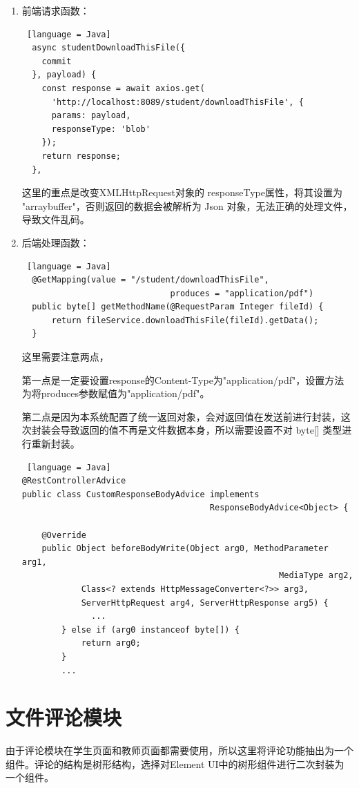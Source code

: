 \begin{enumerate}
  \item 前端请求函数：
        \begin{lstlisting} [language = Java]
  async studentDownloadThisFile({
    commit
  }, payload) {
    const response = await axios.get(
      'http://localhost:8089/student/downloadThisFile', {
      params: payload,
      responseType: 'blob'
    });
    return response;
  },
  \end{lstlisting}
        这里的重点是改变XMLHttpRequest对象的 responseType属性，将其设置为 "arraybuffer"，否则返回的数据会被解析为 Json 对象，无法正确的处理文件，导致文件乱码。
  \item 后端处理函数：
        \begin{lstlisting} [language = Java]
  @GetMapping(value = "/student/downloadThisFile", 
                              produces = "application/pdf")
  public byte[] getMethodName(@RequestParam Integer fileId) {
      return fileService.downloadThisFile(fileId).getData();
  }
  \end{lstlisting}
        这里需要注意两点，

        第一点是一定要设置response的Content-Type为"application/pdf"，设置方法为将produces参数赋值为"application/pdf"。

        第二点是因为本系统配置了统一返回对象，会对返回值在发送前进行封装，这次封装会导致返回的值不再是文件数据本身，所以需要设置不对 byte[] 类型进行重新封装。
        \begin{lstlisting} [language = Java]
@RestControllerAdvice
public class CustomResponseBodyAdvice implements 
                                      ResponseBodyAdvice<Object> {

    @Override
    public Object beforeBodyWrite(Object arg0, MethodParameter arg1, 
                                                    MediaType arg2,
            Class<? extends HttpMessageConverter<?>> arg3, 
            ServerHttpRequest arg4, ServerHttpResponse arg5) {
              ...
        } else if (arg0 instanceof byte[]) {
            return arg0;
        }
        ...
\end{lstlisting}
\end{enumerate}

\section{文件评论模块}

由于评论模块在学生页面和教师页面都需要使用，所以这里将评论功能抽出为一个组件。评论的结构是树形结构，选择对Element UI中的树形组件进行二次封装为一个组件。

